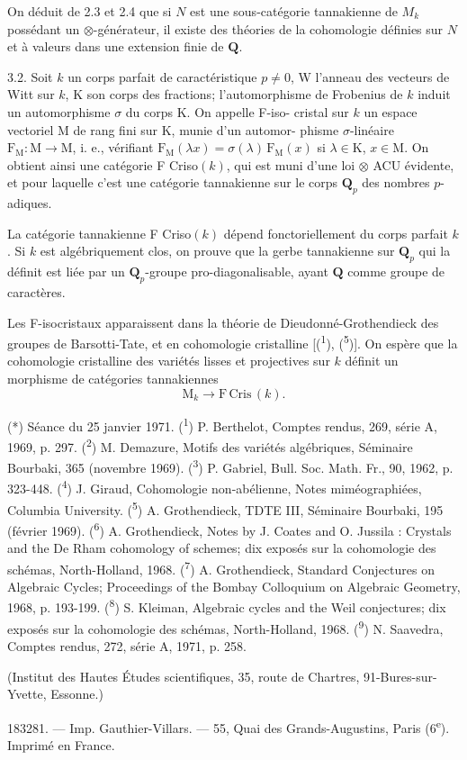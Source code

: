 
On déduit de 2.3 et 2.4 que si $N$ est une sous-catégorie tannakienne de $M_k$
possédant un $\otimes$-générateur, il existe des théories de la cohomologie définies
sur $N$ et à valeurs dans une extension finie de $\mathbf{Q}$.

3.2. Soit $k$ un corps parfait de caractéristique $p \neq 0$, W l'anneau des
vecteurs de Witt sur $k$, K son corps des fractions; l'automorphisme de
Frobenius de $k$ induit un automorphisme $\sigma$ du corps K. On appelle F-iso-%
cristal sur $k$ un espace vectoriel M de rang fini sur K, munie d'un automor-%
phisme $\sigma$-linéaire $\mathrm{F}_{\mathrm{M}} : \mathrm{M} \to \mathrm{M}$, i. e., vérifiant $\mathrm{F}_{\mathrm{M}}(\lambda x) = \sigma(\lambda)\, \mathrm{F}_{\mathrm{M}}(x)$ si
$\lambda \in \mathrm{K}$, $x \in \mathrm{M}$. On obtient ainsi une catégorie F Criso$(k)$, qui est muni d'une
loi $\otimes$ ACU évidente, et pour laquelle c'est une catégorie tannakienne sur
le corps $\mathbf{Q}_p$ des nombres $p$-adiques.

La catégorie tannakienne F Criso$(k)$ dépend fonctoriellement du corps
parfait $k$. Si $k$ est algébriquement clos, on prouve que la gerbe tannakienne
sur $\mathbf{Q}_p$ qui la définit est liée par un $\mathbf{Q}_p$-groupe pro-diagonalisable, ayant
$\mathbf{Q}$ comme groupe de caractères.

Les F-isocristaux apparaissent dans la théorie de Dieudonné-Grothendieck
des groupes de Barsotti-Tate, et en cohomologie cristalline [(\textsuperscript{1}), (\textsuperscript{5})]. On
espère que la cohomologie cristalline des variétés lisses et projectives sur $k$
définit un morphisme de catégories tannakiennes
\[ \mathrm{M}_k \to \mathrm{F\,Cris}\,(k). \]

(*) Séance du 25 janvier 1971.
(\textsuperscript{1}) P. Berthelot, Comptes rendus, 269, série A, 1969, p. 297.
(\textsuperscript{2}) M. Demazure, Motifs des variétés algébriques, Séminaire Bourbaki, 365
(novembre 1969).
(\textsuperscript{3}) P. Gabriel, Bull. Soc. Math. Fr., 90, 1962, p. 323-448.
(\textsuperscript{4}) J. Giraud, Cohomologie non-abélienne, Notes miméographiées, Columbia University.
(\textsuperscript{5}) A. Grothendieck, TDTE III, Séminaire Bourbaki, 195 (février 1969).
(\textsuperscript{6}) A. Grothendieck, Notes by J. Coates and O. Jussila : Crystals and the De Rham
cohomology of schemes; dix exposés sur la cohomologie des schémas, North-Holland, 1968.
(\textsuperscript{7}) A. Grothendieck, Standard Conjectures on Algebraic Cycles; Proceedings of the
Bombay Colloquium on Algebraic Geometry, 1968, p. 193-199.
(\textsuperscript{8}) S. Kleiman, Algebraic cycles and the Weil conjectures; dix exposés sur la cohomologie
des schémas, North-Holland, 1968.
(\textsuperscript{9}) N. Saavedra, Comptes rendus, 272, série A, 1971, p. 258.

(Institut
des Hautes Études scientifiques,
35, route de Chartres,
91-Bures-sur-Yvette, Essonne.)

183281. --- Imp. Gauthier-Villars. --- 55, Quai des Grands-Augustins, Paris (6\textsuperscript{e}).
Imprimé en France.


